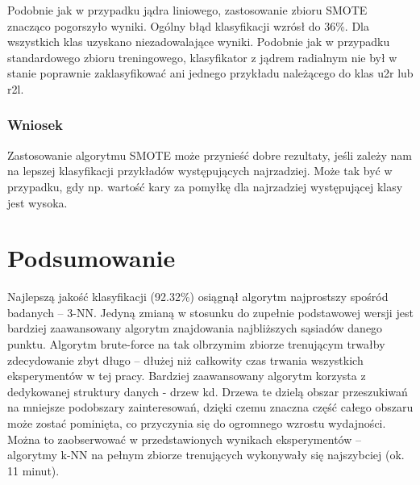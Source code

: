 \documentclass[a4paper, 12pt]{article}
\begin{document}
Podobnie jak w przypadku jądra liniowego, zastosowanie zbioru SMOTE znacząco pogorszyło wyniki. Ogólny błąd klasyfikacji wzrósł do 36\%. Dla wszystkich klas uzyskano niezadowalające wyniki. Podobnie jak w przypadku standardowego zbioru treningowego, klasyfikator z jądrem radialnym nie był w stanie poprawnie zaklasyfikować ani jednego przykładu należącego do klas u2r lub r2l.

\subsubsection{Wniosek}

Zastosowanie algorytmu SMOTE może przynieść dobre rezultaty, 
jeśli zależy nam na lepszej klasyfikacji przykładów występujących najrzadziej.
Może tak być w przypadku, gdy np. wartość kary za pomyłkę dla najrzadziej występującej klasy
jest wysoka.

\section{Podsumowanie}

Najlepszą jakość klasyfikacji (92.32\%) osiągnął algorytm najprostszy spośród badanych -- 3-NN.
Jedyną zmianą w stosunku do zupełnie podstawowej wersji jest bardziej zaawansowany algorytm
znajdowania najbliższych sąsiadów danego punktu. Algorytm brute-force na tak olbrzymim zbiorze
trenującym trwałby zdecydowanie zbyt długo -- dłużej niż całkowity czas trwania wszystkich 
eksperymentów w tej pracy. Bardziej zaawansowany algorytm korzysta z dedykowanej struktury
danych - drzew kd. Drzewa te dzielą obszar przeszukiwań na mniejsze podobszary zainteresowań, dzięki 
czemu znaczna część całego obszaru może zostać pominięta, 
co przyczynia się do ogromnego wzrostu wydajności. Można to zaobserwować w przedstawionych
wynikach eksperymentów -- algorytmy
k-NN na pełnym zbiorze trenujących wykonywały się najszybciej (ok. 11 minut).


\end{document}
